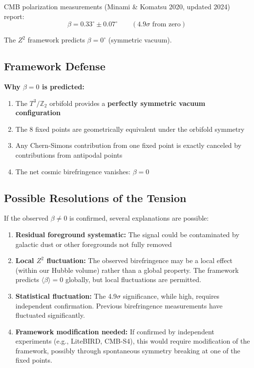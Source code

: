 \documentclass[11pt,a4paper]{article}
\theoremstyle{plain}
\theoremstyle{definition}
\theoremstyle{remark}
\begin{document}
CMB polarization measurements (Minami \& Komatsu 2020, updated 2024) report:
\[
\beta = 0.33^\circ \pm 0.07^\circ \qquad (\text{4.9}\sigma \text{ from zero})
\]

The $Z^2$ framework predicts $\beta = 0^\circ$ (symmetric vacuum).

\subsection{Framework Defense}

\textbf{Why $\beta = 0$ is predicted:}

\begin{enumerate}
  \item The $T^3/\mathbb{Z}_2$ orbifold provides a \textbf{perfectly symmetric vacuum configuration}
  \item The 8 fixed points are geometrically equivalent under the orbifold symmetry
  \item Any Chern-Simons contribution from one fixed point is exactly canceled by contributions from antipodal points
  \item The net cosmic birefringence vanishes: $\beta = 0$
\end{enumerate}

\subsection{Possible Resolutions of the Tension}

If the observed $\beta \neq 0$ is confirmed, several explanations are possible:

\begin{enumerate}
  \item \textbf{Residual foreground systematic:} The signal could be contaminated by galactic dust or other foregrounds not fully removed

  \item \textbf{Local $Z^2$ fluctuation:} The observed birefringence may be a local effect (within our Hubble volume) rather than a global property. The framework predicts $\langle\beta\rangle = 0$ globally, but local fluctuations are permitted.

  \item \textbf{Statistical fluctuation:} The 4.9$\sigma$ significance, while high, requires independent confirmation. Previous birefringence measurements have fluctuated significantly.

  \item \textbf{Framework modification needed:} If confirmed by independent experiments (e.g., LiteBIRD, CMB-S4), this would require modification of the framework, possibly through spontaneous symmetry breaking at one of the fixed points.
\end{enumerate}
\end{document}
